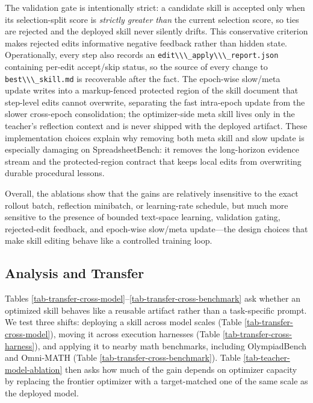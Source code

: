 \documentclass[
]{article}
\newcommand{\passthrough}[1]{#1}
\begin{document}
The validation gate is intentionally strict: a candidate skill is
accepted only when its selection-split score is \emph{strictly greater
than} the current selection score, so ties are rejected and the deployed
skill never silently drifts. This conservative criterion makes rejected
edits informative negative feedback rather than hidden state.
Operationally, every step also records an
\passthrough{\lstinline!edit\\\_apply\\\_report.json!} containing
per-edit accept/skip status, so the source of every change to
\passthrough{\lstinline!best\\\_skill.md!} is recoverable after the
fact. The epoch-wise slow/meta update writes into a markup-fenced
protected region of the skill document that step-level edits cannot
overwrite, separating the fast intra-epoch update from the slower
cross-epoch consolidation; the optimizer-side meta skill lives only in
the teacher's reflection context and is never shipped with the deployed
artifact. These implementation choices explain why removing both meta
skill and slow update is especially damaging on SpreadsheetBench: it
removes the long-horizon evidence stream and the protected-region
contract that keeps local edits from overwriting durable procedural
lessons.

Overall, the ablations show that the gains are relatively insensitive to
the exact rollout batch, reflection minibatch, or learning-rate
schedule, but much more sensitive to the presence of bounded text-space
learning, validation gating, rejected-edit feedback, and epoch-wise
slow/meta update---the design choices that make skill editing behave
like a controlled training loop.

\subsection{Analysis and Transfer}\label{sec-analysis-transfer}

Tables
\ref{tab-transfer-cross-model}--\ref{tab-transfer-cross-benchmark} ask
whether an optimized skill behaves like a reusable artifact rather than
a task-specific prompt. We test three shifts: deploying a skill across
model scales (Table \ref{tab-transfer-cross-model}), moving it across
execution harnesses (Table \ref{tab-transfer-cross-harness}), and
applying it to nearby math benchmarks, including OlympiadBench
\citep{he2024olympiadbench} and Omni-MATH
\citep{gao2024omnimathuniversalolympiadlevel} (Table
\ref{tab-transfer-cross-benchmark}). Table
\ref{tab-teacher-model-ablation} then asks how much of the gain depends
on optimizer capacity by replacing the frontier optimizer with a
target-matched one of the same scale as the deployed model.
\end{document}
